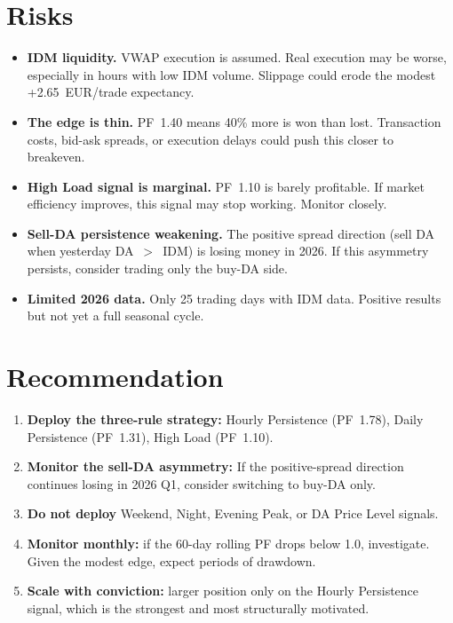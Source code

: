 \documentclass[11pt,a4paper]{article}
\begin{document}
\section{Risks}

\begin{itemize}[leftmargin=*]
\item \textbf{IDM liquidity.} VWAP execution is assumed. Real execution may be worse, especially in hours with low IDM volume. Slippage could erode the modest +2.65~EUR/trade expectancy.
\item \textbf{The edge is thin.} PF~1.40 means 40\% more is won than lost. Transaction costs, bid-ask spreads, or execution delays could push this closer to breakeven.
\item \textbf{High Load signal is marginal.} PF~1.10 is barely profitable. If market efficiency improves, this signal may stop working. Monitor closely.
\item \textbf{Sell-DA persistence weakening.} The positive spread direction (sell DA when yesterday DA~$>$~IDM) is losing money in 2026. If this asymmetry persists, consider trading only the buy-DA side.
\item \textbf{Limited 2026 data.} Only 25 trading days with IDM data. Positive results but not yet a full seasonal cycle.
\end{itemize}

\section{Recommendation}

\begin{enumerate}[leftmargin=*]
\item \textbf{Deploy the three-rule strategy:} Hourly Persistence (PF~1.78), Daily Persistence (PF~1.31), High Load (PF~1.10).
\item \textbf{Monitor the sell-DA asymmetry:} If the positive-spread direction continues losing in 2026 Q1, consider switching to buy-DA only.
\item \textbf{Do not deploy} Weekend, Night, Evening Peak, or DA Price Level signals.
\item \textbf{Monitor monthly:} if the 60-day rolling PF drops below 1.0, investigate. Given the modest edge, expect periods of drawdown.
\item \textbf{Scale with conviction:} larger position only on the Hourly Persistence signal, which is the strongest and most structurally motivated.
\end{enumerate}
\end{document}
